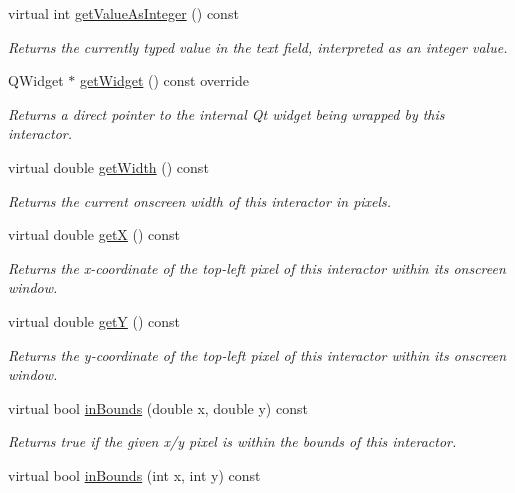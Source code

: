 \begin{DoxyCompactItemize}
virtual int \mbox{\hyperlink{classGTextField_a1cbf643145c03ed4c238d085fc88cf33}{get\+Value\+As\+Integer}} () const
\begin{DoxyCompactList}\small\item\em Returns the currently typed value in the text field, interpreted as an integer value. \end{DoxyCompactList}\item 
Q\+Widget $\ast$ \mbox{\hyperlink{classGTextField_a3b33a602b31a6b809d020535a59db3b4}{get\+Widget}} () const override
\begin{DoxyCompactList}\small\item\em Returns a direct pointer to the internal Qt widget being wrapped by this interactor. \end{DoxyCompactList}\item 
virtual double \mbox{\hyperlink{classGInteractor_a0ed2965abd4f5701d2cadf71239faf19}{get\+Width}} () const
\begin{DoxyCompactList}\small\item\em Returns the current onscreen width of this interactor in pixels. \end{DoxyCompactList}\item 
virtual double \mbox{\hyperlink{classGInteractor_a344385751bee0720059403940d57a13e}{getX}} () const
\begin{DoxyCompactList}\small\item\em Returns the x-\/coordinate of the top-\/left pixel of this interactor within its onscreen window. \end{DoxyCompactList}\item 
virtual double \mbox{\hyperlink{classGInteractor_aafa51c7f8f38a09febbb9ce7853f77b4}{getY}} () const
\begin{DoxyCompactList}\small\item\em Returns the y-\/coordinate of the top-\/left pixel of this interactor within its onscreen window. \end{DoxyCompactList}\item 
virtual bool \mbox{\hyperlink{classGInteractor_afc480f652b8c5f1fb255e2269ce68879}{in\+Bounds}} (double x, double y) const
\begin{DoxyCompactList}\small\item\em Returns true if the given x/y pixel is within the bounds of this interactor. \end{DoxyCompactList}\item 
virtual bool \mbox{\hyperlink{classGInteractor_ae6d7982c1c627b677a5e776ca86118ed}{in\+Bounds}} (int x, int y) const

\end{DoxyCompactItemize}
